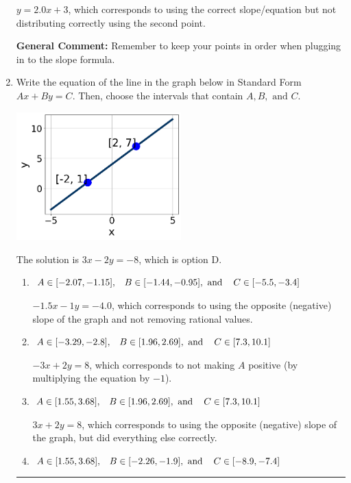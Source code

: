 \documentclass{extbook}[14pt]
\newcommand{\litem}[1]{\item #1

\rule{\textwidth}{0.4pt}}
\begin{document}
\begin{enumerate}
{\begin{enumerate}[label=\Alph*.]
 $y = 2.0x + 3$, which corresponds to using the correct slope/equation but not distributing correctly using the second point.
\end{enumerate}

\textbf{General Comment:} Remember to keep your points in order when plugging in to the slope formula.
}
\litem{
Write the equation of the line in the graph below in Standard Form $Ax+By=C$. Then, choose the intervals that contain $A, B, \text{ and } C$.

\begin{center}
    \includegraphics[width=0.5\textwidth]{../Figures/linearGraphToStandardC.png}
\end{center}


The solution is \( 3x - 2y = -8 \), which is option D.\begin{enumerate}[label=\Alph*.]
\item \( A \in [-2.07, -1.15], \hspace{3mm} B \in [-1.44, -0.95], \text{ and } \hspace{3mm} C \in [-5.5, -3.4] \)

 $-1.5x - 1y = -4.0$, which corresponds to using the opposite (negative) slope of the graph and not removing rational values.
\item \( A \in [-3.29, -2.8], \hspace{3mm} B \in [1.96, 2.69], \text{ and } \hspace{3mm} C \in [7.3, 10.1] \)

 $-3x + 2y = 8$, which corresponds to not making $A$ positive (by multiplying the equation by $-1$).
\item \( A \in [1.55, 3.68], \hspace{3mm} B \in [1.96, 2.69], \text{ and } \hspace{3mm} C \in [7.3, 10.1] \)

 $3x + 2y = 8$, which corresponds to using the opposite (negative) slope of the graph, but did everything else correctly.
\item \( A \in [1.55, 3.68], \hspace{3mm} B \in [-2.26, -1.9], \text{ and } \hspace{3mm} C \in [-8.9, -7.4] \)


\end{enumerate}}
\end{enumerate}
\end{document}
